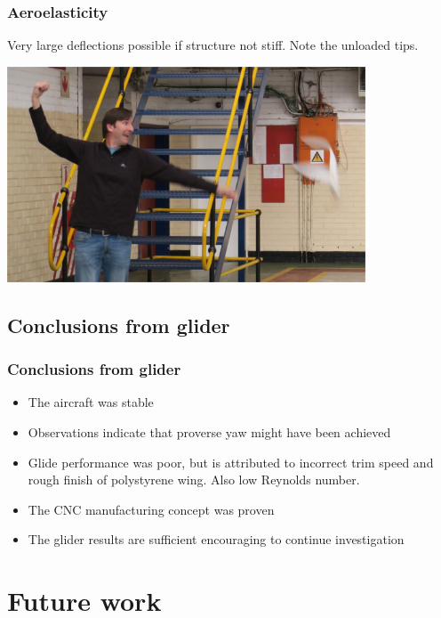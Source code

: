 \documentclass{beamer}
\begin{document}
\begin{frame}
\frametitle{Aeroelasticity}

Very large deflections possible if structure not stiff.  Note the unloaded tips.

\includegraphics[width = 0.8\textwidth]{Pictures/MassiveDeflect.JPG}

\end{frame}

\subsection{Conclusions from glider}

\begin{frame}
\frametitle{Conclusions from glider}

\begin{itemize}
\item The aircraft was stable
\item Observations indicate that proverse yaw might have been achieved
\item Glide performance was poor, but is attributed to incorrect trim speed and rough finish of polystyrene wing.  Also low Reynolds number.
\item The CNC manufacturing concept was proven
\item The glider results are sufficient encouraging to continue investigation
\end{itemize}

\end{frame}





\section{Future work}
\end{document}
